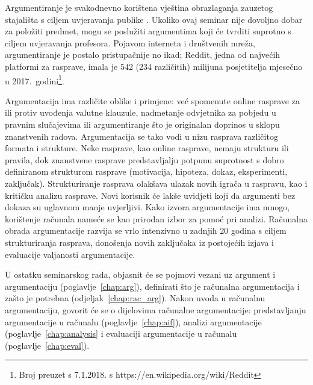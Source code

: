 Argumentiranje je svakodnevno korištena vještina obrazlaganja
zauzetog stajališta s ciljem uvjeravanja publike \citep{walton1990reasoning}.
Ukoliko ovaj seminar nije dovoljno dobar za položiti predmet, 
mogu se poslužiti argumentima koji će tvrditi suprotno s
ciljem uvjeravanja profesora. Pojavom interneta i 
društvenih mreža, 
argumentiranje je postalo pristupačnije no ikad; Reddit,
jedna od najvećih platformi za rasprave, 
imala je 542 (234 različitih) milijuna posjetitelja
mjesečno u 2017.\ godini\footnote{Broj preuzet s 7.1.2018. s https://en.wikipedia.org/wiki/Reddit}.

Argumentacija ima različite oblike i primjene: već spomenute online rasprave
za ili protiv uvođenja valutne klauzule,
nadmetanje odvjetnika za pobjedu u pravnim slučajevima ili
argumentiranje što je originalan doprinos u sklopu znanstvenih radova.
Argumentacija se tako vodi u nizu rasprava različitog formata
i strukture. Neke rasprave, kao online rasprave, nemaju 
strukturu ili pravila, dok 
znanstvene rasprave predstavljalju potpunu suprotnost 
s dobro definiranom strukturom rasprave (motivacija, hipoteza, 
dokaz, eksperimenti, zaključak). 
Strukturiranje rasprava olakšava ulazak novih igrača
u raspravu, kao i kritičku analizu rasprave. Novi korisnik
će lakše uvidjeti koji da argumenti bez dokaza su uglavnom
manje uvjerljivi. 
Kako izvora argumentacije ima mnogo, korištenje računala 
nameće se kao prirodan izbor za pomoć pri analizi. 
Računalna obrada argumentacije razvija se vrlo intenzivno u zadnjih 20 godina
s ciljem strukturiranja rasprava, 
donošenja novih zaključaka iz postojećih izjava
i evaluacije valjanosti argumentacije. 


U ostatku seminarskog rada, objasnit će se pojmovi vezani uz
argument i argumentaciju (poglavlje~\ref{chap:arg}), definirati što je
računalna argumentacija i zašto je potrebna (odjeljak~\ref{chap:rac_arg}).
Nakon uvoda u računalnu argumentaciju, govorit će se o dijelovima
računalne argumentacije: 
predstavljanju argumentacije u računalu (poglavlje~\ref{chap:aif}),
analizi argumentacije (poglavlje~\ref{chap:analysis} i
evaluaciji argumentacije u računalu (poglavlje~\ref{chap:eval}).

% 
% 

